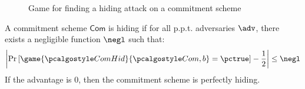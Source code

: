 
\begin{figure}[tbhp]
  \begin{center}
    \begin{tcolorbox}[width=8cm]
      \begin{pchstack}[center]
      \end{pchstack}
    \end{tcolorbox}
  \end{center}
  \caption{Game for finding a hiding attack on a commitment scheme \label{fig:break-com-hid}}
\end{figure}

A commitment scheme $\mathsf{Com}$ is hiding if for all p.p.t. adversaries $\adv$, there exists a negligible function $\negl$ such that:
\[ \left| \pr{\game{\algo{ComHid}}{\algo{Com}, b} = \pctrue} - \frac{1}{2} \right| \leq \negl \]
If the advantage is 0, then the commitment scheme is perfectly hiding.
